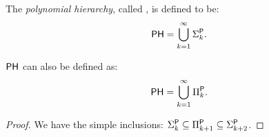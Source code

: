 
\begin{definition}
The \emph{polynomial hierarchy}, called \PH, is defined to be:
\[
\PH = \bigcup_{k = 1}^{\infty} \Sigma_k^\P.
\]
\end{definition}

\begin{theorem}
$\PH$ can also be defined as:
\[
\PH = \bigcup_{k = 1}^{\infty} \Pi_k^\P.
\]
\end{theorem}

\begin{proof}
We have the simple inclusions: $\Sigma_k^\P \subseteq \Pi_{k+1}^\P \subseteq \Sigma_{k+2}^\P$.
\end{proof}

